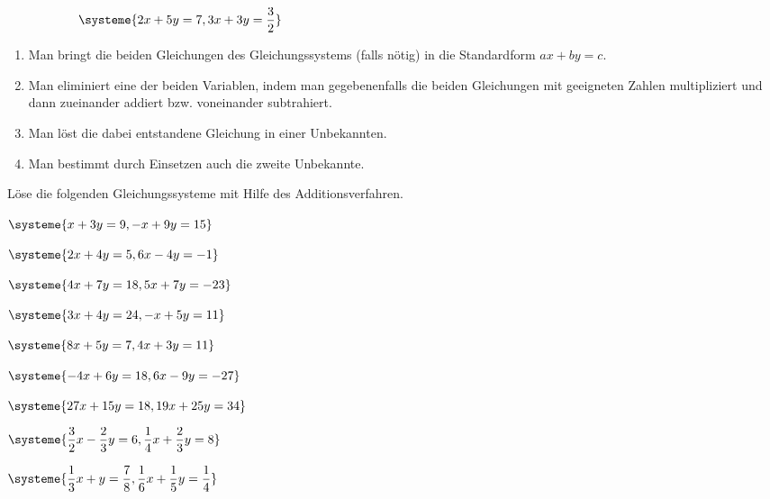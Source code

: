 \documentclass[11pt,oneside]{article}
\begin{document}
	\begin{beispiel}
		\[\systeme{2x+5y=7, 3x+3y=\frac{3}{2}}\hspace*{12cm}\]
	\end{beispiel}
	\begin{algo}[Additionsverfahren]
		\begin{enumerate}[label=\Roman*)]
			\item Man bringt die beiden Gleichungen des Gleichungssystems (falls nötig) in die Standardform $ax+by=c$.
			\item Man eliminiert eine der beiden Variablen, indem man gegebenenfalls die beiden Gleichungen mit geeigneten Zahlen multipliziert und dann zueinander addiert bzw. voneinander subtrahiert.
			\item Man löst die dabei entstandene Gleichung in einer Unbekannten.
			\item Man bestimmt durch Einsetzen auch die zweite Unbekannte.
		\end{enumerate}
	\end{algo}
	\begin{aufgabe}
		Löse die folgenden Gleichungssysteme mit Hilfe des Additionsverfahren.
			\begin{enumcols}[3]
				\item $\displaystyle\systeme{x+3y=9,-x+9y=15}$
				\item $\displaystyle\systeme{2x+4y=5,6x-4y=-1}$
				\item $\displaystyle\systeme{4x+7y=18,5x+7y=-23}$
				\item $\displaystyle\systeme{3x+4y=24,-x+5y=11}$
				\item $\displaystyle\systeme{8x+5y=7,4x+3y=11}$
				\item $\displaystyle\systeme{-4x+6y=18,6x-9y=-27}$
				\item $\displaystyle\systeme{27x+15y=18,19x+25y=34}$
				\item $\displaystyle\systeme{\frac{3}{2}x-\frac{2}{3}y=6,\frac{1}{4}x+\frac{2}{3}y=8}$
				\item $\displaystyle\systeme{\frac{1}{3}x+y=\frac{7}{8},\frac{1}{6}x+\frac{1}{5}y=\frac{1}{4}}$
			\end{enumcols}
	\end{aufgabe}
\end{document}
